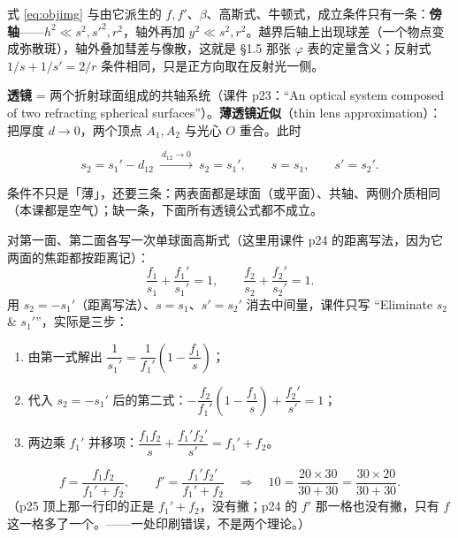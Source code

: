 \documentclass[11pt]{ctexart}
\begin{document}

式 \eqref{eq:objimg} 与由它派生的 $f,f'$、$\beta$、高斯式、牛顿式，成立条件只有一条：\textbf{傍轴}——$h^2\ll s^2,s'^2,r^2$，轴外再加 $y^2\ll s^2,r^2$。越界后轴上出现球差（一个物点变成弥散斑），轴外叠加彗差与像散，这就是 §1.5 那张 $\varphi$ 表的定量含义；反射式 $1/s+1/s'=2/r$ 条件相同，只是正方向取在反射光一侧。



\textbf{透镜} = 两个折射球面组成的共轴系统（课件 p23：``An optical system composed of two refracting spherical surfaces''）。\textbf{薄透镜近似}（thin lens approximation）：把厚度 $d\to0$，两个顶点 $A_1,A_2$ 与光心 $O$ 重合。此时

\[
s_2=s_1'-d_{12}\ \xrightarrow{\ d_{12}\to0\ }\ s_2=s_1',
\qquad s=s_1,\qquad s'=s_2' .
\]

条件不只是「薄」，还要三条：两表面都是球面（或平面）、共轴、两侧介质相同（本课都是空气）；缺一条，下面所有透镜公式都不成立。


对第一面、第二面各写一次单球面高斯式（这里用课件 p24 的距离写法，因为它两面的焦距都按距离记）：
\[
\frac{f_1}{s_1}+\frac{f_1'}{s_1'}=1,\qquad
\frac{f_2}{s_2}+\frac{f_2'}{s_2'}=1 .
\]
用 $s_2=-s_1'$（距离写法）、$s=s_1$、$s'=s_2'$ 消去中间量，课件只写 ``Eliminate $s_2$ \& $s_1'$''，实际是三步：

\begin{enumerate}
  \item 由第一式解出 $\dfrac{1}{s_1'}=\dfrac{1}{f_1'}\left(1-\dfrac{f_1}{s}\right)$；
  \item 代入 $s_2=-s_1'$ 后的第二式：$-\dfrac{f_2}{f_1'}\left(1-\dfrac{f_1}{s}\right)+\dfrac{f_2'}{s'}=1$；
  \item 两边乘 $f_1'$ 并移项：$\dfrac{f_1f_2}{s}+\dfrac{f_1'f_2'}{s'}=f_1'+f_2$。
\end{enumerate}

\[
f=\frac{f_1f_2}{f_1'+f_2},\qquad f'=\frac{f_1'f_2'}{f_1'+f_2}
\quad\Longrightarrow\quad 10=\frac{20\times30}{30+30}=\frac{30\times20}{30+30}.
\]
（p25 顶上那一行印的正是 $f_1'+f_2$，没有撇；p24 的 $f'$ 那一格也没有撇，只有 $f$ 这一格多了一个。——一处印刷错误，不是两个理论。）
\end{document}
